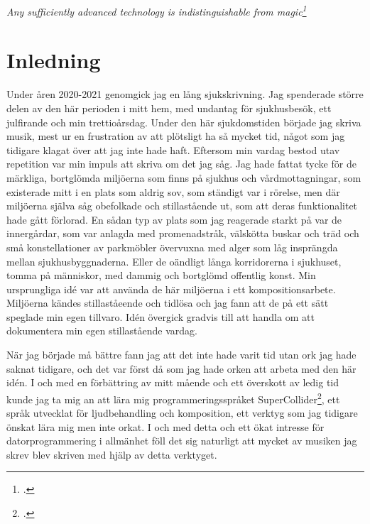 \documentclass{article}
\begin{document}
\begin{titlepage}
	
\end{titlepage}

\begin{center}
	\hspace{0pt}
	\vfill
	\emph{Any sufficiently advanced technology is indistinguishable from magic\footcite{ArthurCClarkeMagic}}
	\vfill
	\hspace{0pt}
\end{center}
\newpage
\tableofcontents[\large]
\newpage

\section{Inledning}
Under åren 2020-2021 genomgick jag en lång sjukskrivning. Jag spenderade större delen av den här perioden i
mitt hem, med undantag för sjukhusbesök, ett julfirande och min trettioårsdag. Under den här sjukdomstiden
började jag skriva musik, mest ur en frustration av att plötsligt ha så mycket tid, något som jag
tidigare klagat över att jag inte hade haft. Eftersom min vardag bestod utav repetition var min impuls att
skriva om det jag såg. Jag hade fattat tycke för de märkliga, bortglömda miljöerna som finns på sjukhus och
vårdmottagningar, som existerade mitt i en plats som aldrig sov, som ständigt var i rörelse, men där miljöerna
själva såg obefolkade och stillastående ut, som att deras funktionalitet hade gått förlorad. En sådan typ av
plats som jag reagerade starkt på var de innergårdar, som var anlagda med promenadstråk, välskötta buskar
och träd och små konstellationer av parkmöbler övervuxna med alger som låg insprängda mellan
sjukhusbyggnaderna. Eller de oändligt långa korridorerna i sjukhuset, tomma på människor, med dammig och
bortglömd offentlig konst. 
Min ursprungliga idé var att använda de här miljöerna i ett kompositionsarbete. 
Miljöerna kändes stillaståeende och tidlösa och jag fann att de på ett sätt speglade min egen tillvaro. Idén
övergick gradvis till att handla om att dokumentera min egen stillastående vardag.

När jag började må bättre fann jag att det inte hade varit tid utan ork jag hade saknat tidigare, och det var
först då som jag hade orken att arbeta med den här idén. I och med en förbättring av
mitt mående och ett överskott av ledig tid kunde jag ta mig an att lära mig programmeringsspråket 
SuperCollider\footcite{sc}, ett språk utvecklat för ljudbehandling och
komposition, ett verktyg som jag tidigare önskat lära mig men inte orkat. I och med detta och ett ökat
intresse för datorprogrammering i allmänhet föll det sig naturligt att mycket av musiken jag skrev blev
skriven med hjälp av detta verktyget.
\end{document}

